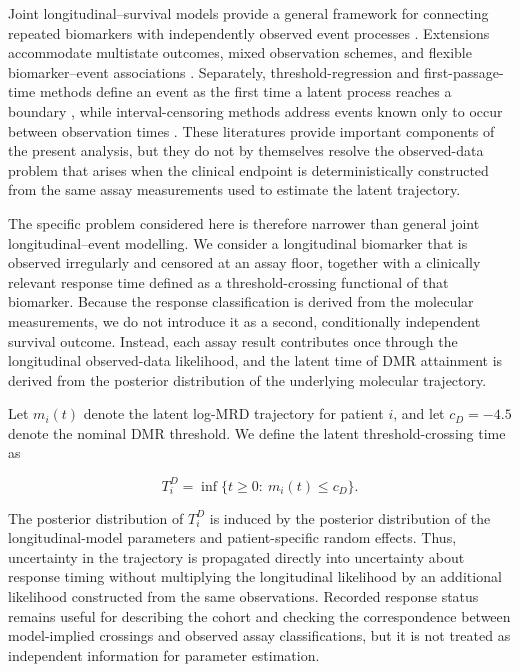 \documentclass[11pt]{article}
\begin{document}
Joint longitudinal--survival models provide a general framework for connecting repeated biomarkers with independently observed event processes
\cite{Wulfsohn1997JointModel,Rizopoulos2016JMbayes}. Extensions accommodate multistate outcomes, mixed observation schemes, and flexible biomarker--event associations
\cite{Lovblom2026MixedObservationJointModel,Niu2026QuantileJointModel}. Separately, threshold-regression and first-passage-time methods define an event as the first time a latent process reaches a boundary
\cite{LeeWhitmore2006ThresholdRegression,AalenGjessing2001ProcessView,AalenBorganGjessing2008}, while interval-censoring methods address events known only to occur between observation times
\cite{Sun2006IntervalCensored}. These literatures provide important components of the present analysis, but they do not by themselves resolve the observed-data problem that arises when the clinical endpoint is deterministically constructed from the same assay measurements used to estimate the latent trajectory.

The specific problem considered here is therefore narrower than general joint longitudinal--event modelling. We consider a longitudinal biomarker that is observed irregularly and censored at an assay floor, together with a clinically relevant response time defined as a threshold-crossing functional of that biomarker. Because the response classification is derived from the molecular measurements, we do not introduce it as a second, conditionally independent survival outcome. Instead, each assay result contributes once through the longitudinal observed-data likelihood, and the latent time of DMR attainment is derived from the posterior distribution of the underlying molecular trajectory.

Let $m_i(t)$ denote the latent log-MRD trajectory for patient $i$, and let $c_D=-4.5$ denote the nominal DMR threshold. We define the latent threshold-crossing time as

\[
T_i^D=\inf\{t\geq 0:\ m_i(t)\leq c_D\}.
\]

The posterior distribution of $T_i^D$ is induced by the posterior distribution of the longitudinal-model parameters and patient-specific random effects. Thus, uncertainty in the trajectory is propagated directly into uncertainty about response timing without multiplying the longitudinal likelihood by an additional likelihood constructed from the same observations. Recorded response status remains useful for describing the cohort and checking the correspondence between model-implied crossings and observed assay classifications, but it is not treated as independent information for parameter estimation.
\end{document}
